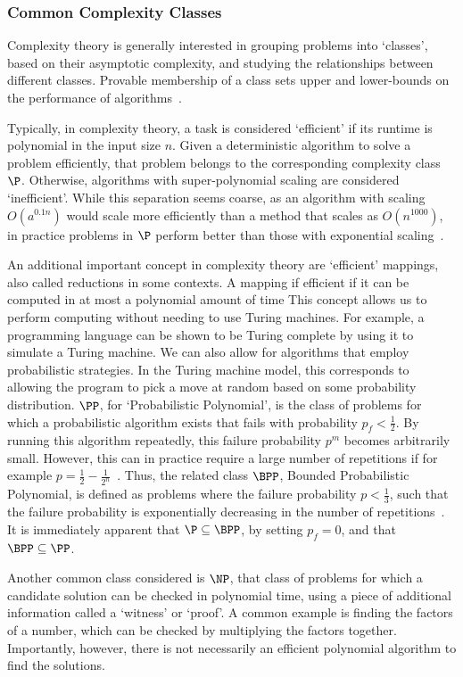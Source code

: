 \subsubsection*{Common Complexity Classes}
Complexity theory is generally interested in grouping problems into `classes', based on their asymptotic complexity, and studying the relationships between different classes. Provable membership of a class sets upper and lower-bounds on the performance of algorithms~\cite{Nielsen2000}.\par
Typically, in complexity theory, a task is considered `efficient' if its runtime is polynomial in the input size $n$. Given a deterministic algorithm to solve a problem efficiently, that problem belongs to the corresponding complexity class $\P$. Otherwise, algorithms with super-polynomial  scaling are considered `inefficient'. While this separation seems coarse, as an algorithm with scaling $O\left(a^{0.1n}\right)$ would scale more efficiently than a method that scales as $O(n^{1000})$, in practice problems in $\P$ perform better than those with exponential scaling~\cite{Nielsen2000}.\par
An additional important concept in complexity theory are `efficient' mappings, also called reductions in some contexts. A mapping if efficient if it can be computed in at most a polynomial amount of time This concept allows us to perform computing without needing to use Turing machines. For example, a programming language can be shown to be Turing complete by using it to simulate a Turing machine.
We can also allow for algorithms that employ probabilistic strategies. In the Turing machine model, this corresponds to allowing the program to pick a move at random based on some probability distribution. $\PP$, for `Probabilistic Polynomial', is the class of problems for which a probabilistic algorithm exists that fails with probability $p_{f}<\frac{1}{2}$. By running this algorithm repeatedly, this failure probability $p^{m}$ becomes arbitrarily small. However, this can in practice require a large number of repetitions if for example $p=\frac{1}{2}-\frac{1}{2^{n}}$~\cite{Aaronson2004c}. Thus, the related class $\BPP$, Bounded Probabilistic Polynomial, is defined as problems where the failure probability $p < \frac{1}{3}$, such that the failure probability is exponentially decreasing in the number of repetitions~\cite{Nielsen2000}. It is immediately apparent that $\P\subseteq \BPP$, by setting $p_{f}=0$, and that $\BPP\subseteq \PP$.\par
Another common class considered is $\NP$, that class of problems for which a candidate solution can be checked in polynomial time, using a piece of additional information called a `witness' or `proof'. A common example is finding the factors of a number, which can be checked by multiplying the factors together. Importantly, however, there is not necessarily an efficient polynomial algorithm to find the solutions.\par
